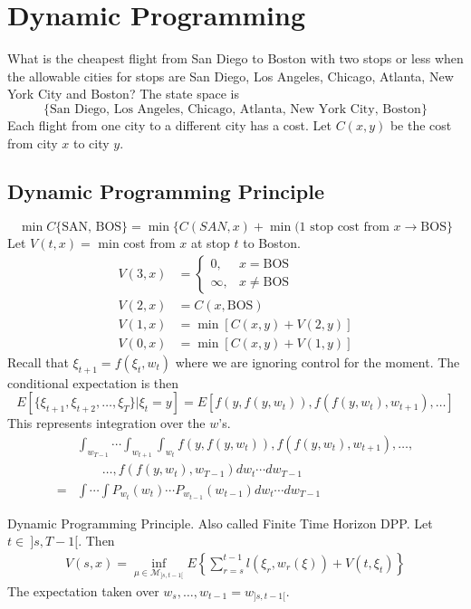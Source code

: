 \section{Dynamic Programming}
What is the cheapest flight from San Diego to Boston with two stops or less when the allowable cities for stops are San Diego, Los Angeles, Chicago, Atlanta, New York City and Boston? The state space is
$$\{\text{San Diego, Los Angeles, Chicago, Atlanta, New York City, Boston}\}$$
Each flight from one city to a different city has a cost. Let $C(x,y)$ be the cost from city $x$ to city $y$.

\subsection{Dynamic Programming Principle}
$$\min C\{\text{SAN, BOS}\} = \min\{C(SAN,x) + \min(\text{1 stop cost from }x\to\text{BOS}\}$$
Let $V(t,x) =$ min cost from $x$ at stop $t$ to Boston.
\begin{align*}
V(3,x) &= \begin{cases} 0, & x=\text{BOS} \\ \infty, & x\neq\text{BOS} \end{cases} \\
V(2,x) &= C(x,\text{BOS}) \\
V(1,x) &= \min[C(x,y)+V(2,y)] \\
V(0,x) &= \min[C(x,y)+V(1,y)]
\end{align*}
Recall that $\xi_{t+1}=f(\xi_t,w_t)$ where we are ignoring control for the moment. The conditional expectation is then
$$E[\{\xi_{t+1},\xi_{t+2},\ldots,\xi_T\}|\xi_t=y] = E[f(y,f(y,w_t)),f(f(y,w_t),w_{t+1}),\ldots]$$
This represents integration over the $w$'s.
\begin{align*}
&\int_{w_{T-1}}\cdots\int_{w_{t+1}}\int_{w_t}f(y,f(y,w_t)),f(f(y,w_t),w_{t+1}),\ldots, \\
&\qquad \ldots,f(f(y,w_t),w_{T-1})dw_t\cdots dw_{T-1} \\
= &\int\cdots\int P_{w_t}(w_t)\cdots P_{w_{t-1}}(w_{t-1})dw_t\cdots dw_{T-1}
\end{align*}

\begin{theorem}{Dynamic Programming Principle.}
Also called Finite Time Horizon DPP. Let $t\in~]s,T-1[$. Then
\begin{align}
\label{eq:dpp}
V(s,x) = \inf_{\mu\in\mathcal{M}_{]s,t-1[}}E\left\lbrace\sum_{r=s}^{t-1}l(\xi_r,w_r(\xi)) + V(t,\xi_t)\right\rbrace
\end{align}
The expectation taken over $w_s,\ldots,w_{t-1} = w_{]s,t-1[}$.
\end{theorem}


